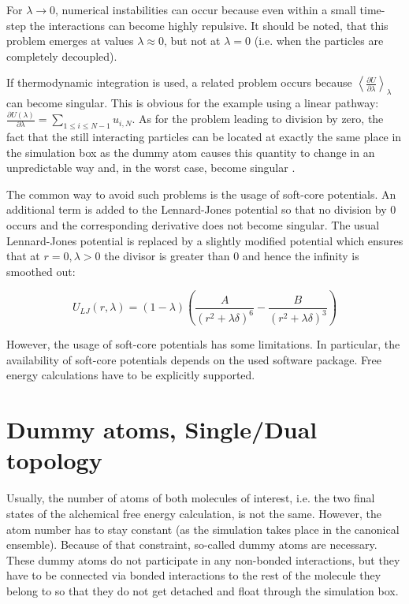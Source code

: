 For $\lambda\rightarrow0$, numerical instabilities can occur because
even within a small time-step the interactions can become highly repulsive.
It should be noted, that this problem emerges at values $\lambda\approx0$,
but not at $\lambda=0$ (i.e. when the particles are completely decoupled).

If thermodynamic integration is used, a related problem occurs because
$\left\langle \frac{\partial U}{\partial\lambda}\right\rangle _{\lambda}$can
become singular. This is obvious for the example using a linear pathway:
$\frac{\partial U\left(\lambda\right)}{\partial\lambda}=\sum_{1\leq i\leq N-1}u_{i,N}$.
As for the problem leading to division by zero, the fact that the
still interacting particles can be located at exactly the same place
in the simulation box as the dummy atom causes this quantity to change
in an unpredictable way and, in the worst case, become singular \cite{Boresch.2011}.

The common way to avoid such problems is the usage of soft-core potentials.
An additional term is added to the Lennard-Jones potential so that
no division by 0 occurs and the corresponding derivative does not
become singular. The usual Lennard-Jones potential is replaced by
a slightly modified potential which ensures that at $r=0,\lambda>\text{0}$
the divisor is greater than 0 and hence the infinity is smoothed out:

\[
U_{LJ}\left(r,\lambda\right)=\left(1-\lambda\right)\left(\frac{A}{\left(r^{2}+\lambda\delta\right)^{6}}-\frac{B}{\left(r^{2}+\lambda\delta\right)^{3}}\right)
\]

However, the usage of soft-core potentials has some limitations. In
particular, the availability of soft-core potentials depends on the
used software package. Free energy calculations have to be explicitly
supported. 

\section{Dummy atoms, Single/Dual topology}

Usually, the number of atoms of both molecules of interest, i.e. the
two final states of the alchemical free energy calculation, is not
the same. However, the atom number has to stay constant (as the simulation
takes place in the canonical ensemble). Because of that constraint,
so-called dummy atoms are necessary. \cite{Fleck.2021} These dummy
atoms do not participate in any non-bonded interactions, but they
have to be connected via bonded interactions to the rest of the molecule
they belong to so that they do not get detached and float through
the simulation box.

